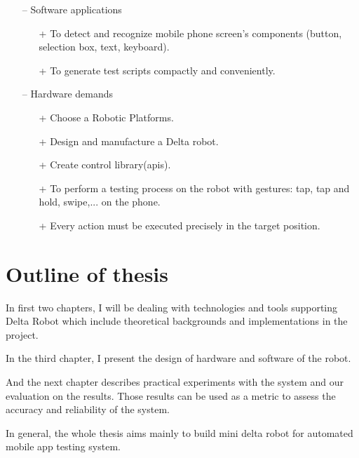 \begin{itemize}
\item[--] Software applications
	\begin{itemize}
		\item[+] To detect and recognize mobile phone screen's components (button, selection box, text, keyboard).
		\item[+] To generate test scripts compactly and conveniently.
	\end{itemize}
\item[--] Hardware demands
	\begin{itemize}
		\item[+] Choose a Robotic Platforms.
		\item[+] Design and manufacture a Delta robot.
		\item[+] Create control library(\glspl{api}).
		\item[+] To perform a testing process on the robot with gestures: tap, tap and hold, swipe,... on the phone.
		\item[+] Every action must be executed precisely in the target position.
	\end{itemize}
\end{itemize}

\section{Outline of thesis}

In first two chapters, I will be dealing with technologies and tools supporting Delta Robot which include theoretical backgrounds and implementations in the project.

In the third chapter, I present the design of hardware and software of the robot.

And the next chapter describes practical experiments with the system and our evaluation on the results. Those results can be used as a metric to assess the accuracy and reliability of the system.

In general, the whole thesis aims mainly to build mini delta robot for automated mobile app testing system. \nocite{radim_thesis}